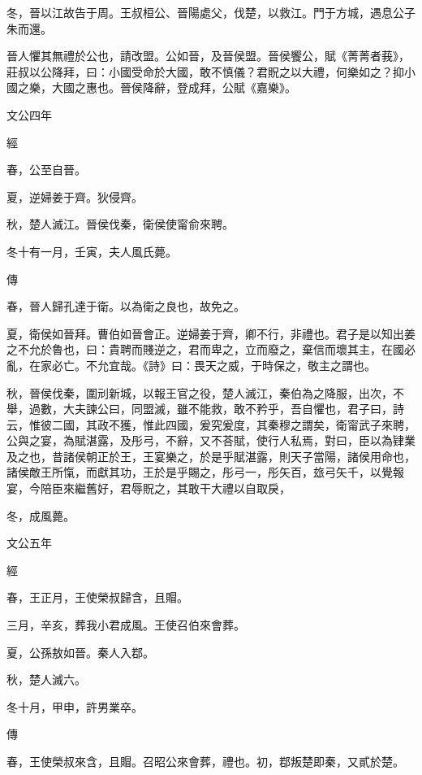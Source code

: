 \documentclass{ctexart}
\begin{document}
冬，晉以江故告于周。王叔桓公、晉陽處父，伐楚，以救江。門于方城，遇息公子朱而還。

晉人懼其無禮於公也，請改盟。公如晉，及晉侯盟。晉侯饗公，賦《菁菁者莪》，莊叔以公降拜，曰：小國受命於大國，敢不慎儀？君貺之以大禮，何樂如之？抑小國之樂，大國之惠也。晉侯降辭，登成拜，公賦《嘉樂》。





文公四年


經



春，公至自晉。

夏，逆婦姜于齊。狄侵齊。

秋，楚人滅江。晉侯伐秦，衛侯使甯俞來聘。

冬十有一月，壬寅，夫人風氏薨。

傳



春，晉人歸孔達于衛。以為衛之良也，故免之。

夏，衛侯如晉拜。曹伯如晉會正。逆婦姜于齊，卿不行，非禮也。君子是以知出姜之不允於魯也，曰：貴聘而賤逆之，君而卑之，立而廢之，棄信而壞其主，在國必亂，在家必亡。不允宜哉。《詩》曰：畏天之威，于時保之，敬主之謂也。

秋，晉侯伐秦，圍刓新城，以報王官之役，楚人滅江，秦伯為之降服，出次，不舉，過數，大夫諫公曰，同盟滅，雖不能救，敢不矜乎，吾自懼也，君子曰，詩云，惟彼二國，其政不獲，惟此四國，爰究爰度，其秦穆之謂矣，衛甯武子來聘，公與之宴，為賦湛露，及彤弓，不辭，又不荅賦，使行人私焉，對曰，臣以為肄業及之也，昔諸侯朝正於王，王宴樂之，於是乎賦湛露，則天子當陽，諸侯用命也，諸侯敵王所愾，而獻其功，王於是乎賜之，彤弓一，彤矢百，玈弓矢千，以覺報宴，今陪臣來繼舊好，君辱貺之，其敢干大禮以自取戾，

冬，成風薨。





文公五年


經



春，王正月，王使榮叔歸含，且賵。

三月，辛亥，葬我小君成風。王使召伯來會葬。

夏，公孫敖如晉。秦人入鄀。

秋，楚人滅六。

冬十月，甲申，許男業卒。

傳



春，王使榮叔來含，且賵。召昭公來會葬，禮也。初，鄀叛楚即秦，又貳於楚。
\end{document}
